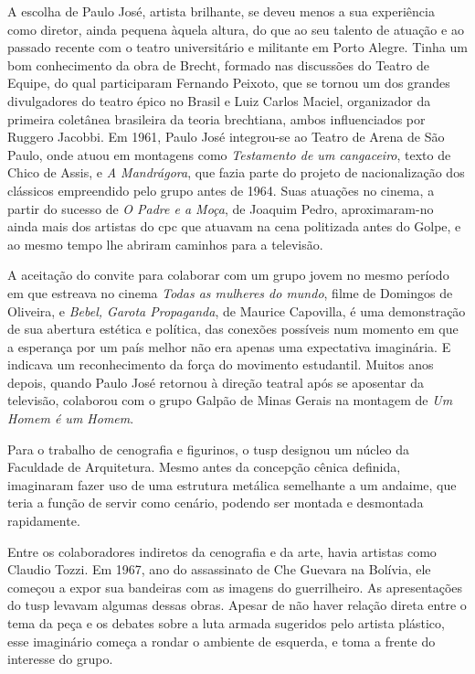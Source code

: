 A escolha de Paulo José, artista brilhante, se deveu menos a sua
experiência como diretor, ainda pequena àquela altura, do que ao seu
talento de atuação e ao passado recente com o teatro universitário e
militante em Porto Alegre. Tinha um bom conhecimento da obra de Brecht,
formado nas discussões do Teatro de Equipe, do qual participaram
Fernando Peixoto, que se tornou um dos grandes divulgadores do teatro
épico no Brasil e Luiz Carlos Maciel, organizador da primeira coletânea
brasileira da teoria brechtiana, ambos influenciados por Ruggero
Jacobbi. Em 1961, Paulo José integrou-se ao Teatro de Arena de São
Paulo, onde atuou em montagens como {\it Testamento de um cangaceiro},
texto de Chico de Assis, e {\it A Mandrágora}, que fazia parte do
projeto de nacionalização dos clássicos empreendido pelo grupo antes de
1964. Suas atuações no cinema, a partir do sucesso de {\it O Padre e a
Moça}, de Joaquim Pedro, aproximaram-no ainda mais dos artistas do {\sc cpc}
que atuavam na cena politizada antes do Golpe, e ao mesmo tempo lhe
abriram caminhos para a televisão.

A aceitação do convite para colaborar com um grupo jovem no mesmo
período em que estreava no cinema {\it Todas as mulheres do mundo},
filme de Domingos de Oliveira, e {\it Bebel, Garota Propaganda}, de
Maurice Capovilla, é uma demonstração de sua abertura estética e
política, das conexões possíveis num momento em que a esperança por um
país melhor não era apenas uma expectativa imaginária. E indicava um
reconhecimento da força do movimento estudantil. Muitos anos depois,
quando Paulo José retornou à direção teatral após se aposentar da
televisão, colaborou com o grupo Galpão de Minas Gerais na montagem de
{\it Um Homem é um Homem}.

Para o trabalho de cenografia e figurinos, o {\sc tusp} designou um núcleo da
Faculdade de Arquitetura. Mesmo antes da concepção cênica definida,
imaginaram fazer uso de uma estrutura metálica semelhante a um andaime,
que teria a função de servir como cenário, podendo ser montada e
desmontada rapidamente.

Entre os colaboradores indiretos da cenografia e da arte, havia artistas
como Claudio Tozzi. Em 1967, ano do assassinato de Che Guevara na
Bolívia, ele começou a expor sua bandeiras com as imagens do
guerrilheiro. As apresentações do {\sc tusp} levavam algumas dessas obras.
Apesar de não haver relação direta entre o tema da peça e os debates
sobre a luta armada sugeridos pelo artista plástico, esse imaginário
começa a rondar o ambiente de esquerda, e toma a frente do interesse do
grupo.

